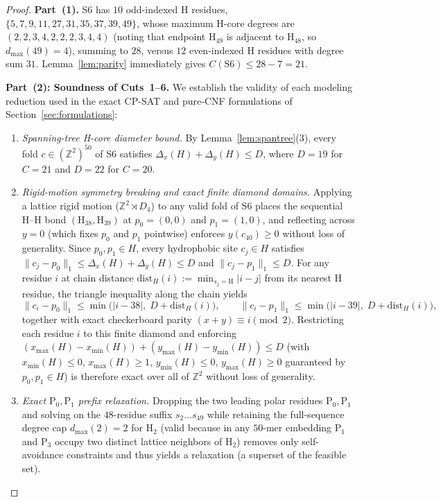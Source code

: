 \documentclass[11pt]{article}
\newcommand{\Z}{\mathbb{Z}}
\begin{document}
\begin{proof}
\textbf{Part~(1).} S6 has $10$ odd-indexed H residues, $\{5, 7, 9, 11, 27, 31, 35, 37, 39, 49\}$, whose maximum H-core degrees are $(2, 2, 3, 4, 2, 2, 2, 3, 4, 4)$ (noting that endpoint $\mathrm{H}_{49}$ is adjacent to $\mathrm{H}_{48}$, so $d_{\max}(49) = 4$), summing to $28$, versus $12$ even-indexed H residues with degree sum $31$. Lemma~\ref{lem:parity} immediately gives $C(\mathrm{S6}) \le 28 - 7 = 21$.

\textbf{Part~(2): Soundness of Cuts~1--6.} We establish the validity of each modeling reduction used in the exact CP-SAT and pure-CNF formulations of Section~\ref{sec:formulations}:
\begin{enumerate}[label=\textbf{Cut~\arabic*.},leftmargin=*,topsep=2pt,itemsep=2pt]
\item \emph{Spanning-tree H-core diameter bound.} By Lemma~\ref{lem:spantree}(3), every fold $c \in (\Z^2)^{50}$ of S6 satisfies $\Delta_x(H) + \Delta_y(H) \le D$, where $D = 19$ for $C = 21$ and $D = 22$ for $C = 20$.
\item \emph{Rigid-motion symmetry breaking and exact finite diamond domains.} Applying a lattice rigid motion ($\Z^2 \rtimes D_4$) to any valid fold of S6 places the sequential H--H bond $(\mathrm{H}_{38}, \mathrm{H}_{39})$ at $p_0 = (0, 0)$ and $p_1 = (1, 0)$, and reflecting across $y = 0$ (which fixes $p_0$ and $p_1$ pointwise) enforces $y(c_{40}) \ge 0$ without loss of generality. Since $p_0, p_1 \in H$, every hydrophobic site $c_j \in H$ satisfies $\|c_j - p_0\|_1 \le \Delta_x(H) + \Delta_y(H) \le D$ and $\|c_j - p_1\|_1 \le D$. For any residue $i$ at chain distance $\mathrm{dist}_H(i) := \min_{s_j = \mathrm{H}} |i - j|$ from its nearest H residue, the triangle inequality along the chain yields
\[
  \|c_i - p_0\|_1 \le \min\bigl(|i - 38|,\; D + \mathrm{dist}_H(i)\bigr),
  \qquad
  \|c_i - p_1\|_1 \le \min\bigl(|i - 39|,\; D + \mathrm{dist}_H(i)\bigr),
\]
together with exact checkerboard parity $(x + y) \equiv i \pmod 2$. Restricting each residue $i$ to this finite diamond and enforcing $(x_{\max}(H) - x_{\min}(H)) + (y_{\max}(H) - y_{\min}(H)) \le D$ (with $x_{\min}(H) \le 0$, $x_{\max}(H) \ge 1$, $y_{\min}(H) \le 0$, $y_{\max}(H) \ge 0$ guaranteed by $p_0, p_1 \in H$) is therefore exact over all of $\Z^2$ without loss of generality.
\item \emph{Exact $\mathrm{P}_0, \mathrm{P}_1$ prefix relaxation.} Dropping the two leading polar residues $\mathrm{P}_0, \mathrm{P}_1$ and solving on the $48$-residue suffix $s_2 \dots s_{49}$ while retaining the full-sequence degree cap $d_{\max}(2) = 2$ for $\mathrm{H}_2$ (valid because in any $50$-mer embedding $\mathrm{P}_1$ and $\mathrm{P}_3$ occupy two distinct lattice neighbors of $\mathrm{H}_2$) removes only self-avoidance constraints and thus yields a relaxation (a superset of the feasible set).

\end{enumerate}
\end{proof}
\end{document}
